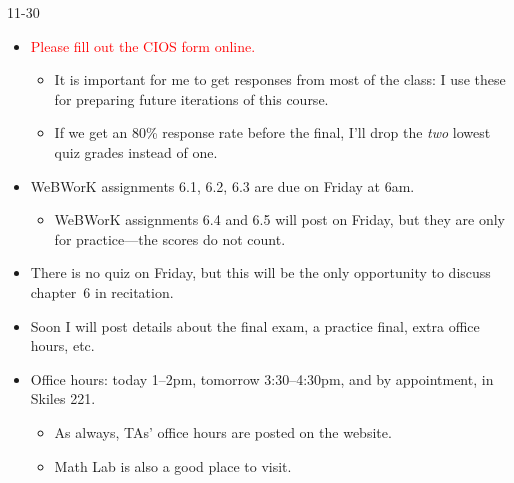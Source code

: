 \begin{ann}{11-30}
  \begin{itemize}
    \item \textcolor{red}{Please fill out the CIOS form online.}
      \begin{itemize}
      \item It is important for me to get responses from most of the class: I
        use these for preparing future iterations of this course.
      \item If we get an 80\% response rate before the final, I'll drop
        the \emph{two} lowest quiz grades instead of one.
      \end{itemize}
      \medskip

    \item WeBWorK assignments 6.1, 6.2, 6.3 are due on Friday at 6am.
      \begin{itemize}
      \item WeBWorK assignments 6.4 and 6.5 will post on Friday, but they are
        only for practice---the scores do not count.
      \end{itemize}
      \medskip

    \item There is no quiz on Friday, but this will be the only opportunity to
      discuss chapter~6 in recitation.
      \bigskip

    \item Soon I will post details about the final exam, a practice final, extra
      office hours, etc.
      \bigskip

    \item Office hours: today 1--2pm, tomorrow 3:30--4:30pm, and by
      appointment, in Skiles 221.
      \begin{itemize}
      \item As always, TAs' office hours are posted on the website.
      \item Math Lab is also a good place to visit.
      \end{itemize}

  \end{itemize}
\end{ann}

